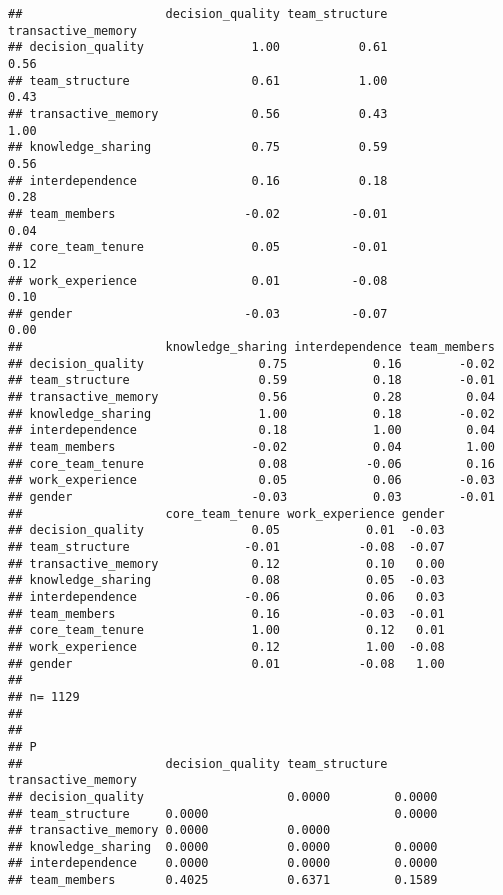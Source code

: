 \documentclass[]{article}
\begin{document}
\begin{verbatim}
##                    decision_quality team_structure transactive_memory
## decision_quality               1.00           0.61               0.56
## team_structure                 0.61           1.00               0.43
## transactive_memory             0.56           0.43               1.00
## knowledge_sharing              0.75           0.59               0.56
## interdependence                0.16           0.18               0.28
## team_members                  -0.02          -0.01               0.04
## core_team_tenure               0.05          -0.01               0.12
## work_experience                0.01          -0.08               0.10
## gender                        -0.03          -0.07               0.00
##                    knowledge_sharing interdependence team_members
## decision_quality                0.75            0.16        -0.02
## team_structure                  0.59            0.18        -0.01
## transactive_memory              0.56            0.28         0.04
## knowledge_sharing               1.00            0.18        -0.02
## interdependence                 0.18            1.00         0.04
## team_members                   -0.02            0.04         1.00
## core_team_tenure                0.08           -0.06         0.16
## work_experience                 0.05            0.06        -0.03
## gender                         -0.03            0.03        -0.01
##                    core_team_tenure work_experience gender
## decision_quality               0.05            0.01  -0.03
## team_structure                -0.01           -0.08  -0.07
## transactive_memory             0.12            0.10   0.00
## knowledge_sharing              0.08            0.05  -0.03
## interdependence               -0.06            0.06   0.03
## team_members                   0.16           -0.03  -0.01
## core_team_tenure               1.00            0.12   0.01
## work_experience                0.12            1.00  -0.08
## gender                         0.01           -0.08   1.00
## 
## n= 1129 
## 
## 
## P
##                    decision_quality team_structure transactive_memory
## decision_quality                    0.0000         0.0000            
## team_structure     0.0000                          0.0000            
## transactive_memory 0.0000           0.0000                           
## knowledge_sharing  0.0000           0.0000         0.0000            
## interdependence    0.0000           0.0000         0.0000            
## team_members       0.4025           0.6371         0.1589            

\end{verbatim}
\end{document}
